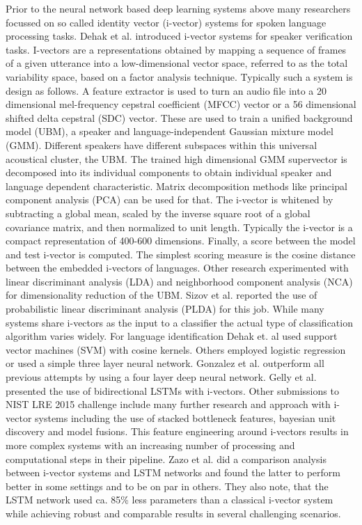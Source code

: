 Prior to the neural network based deep learning systems above many researchers focussed on so called identity vector (i-vector) systems for spoken language processing tasks. Dehak et al.\cite{dehak2011front} introduced i-vector systems for speaker verification tasks. I-vectors are a representations obtained by mapping a sequence of frames of a given utterance into a low-dimensional vector space, referred to as the total 	variability space, based on a factor analysis technique. Typically such a system is design as follows. A feature extractor is used to turn an audio file into a 20 dimensional mel-frequency cepstral coefficient (MFCC) vector or a 56 dimensional shifted delta cepstral (SDC) vector. These are used to train a unified background model (UBM), a speaker and language-independent Gaussian mixture model (GMM). Different speakers have different subspaces within this universal acoustical cluster, the UBM. The trained high dimensional GMM supervector is decomposed into its individual components to obtain individual speaker and language dependent characteristic. Matrix decomposition methods like principal component analysis (PCA) can be used for that. The i-vector is whitened by subtracting a global mean, scaled by the inverse square root of a global covariance matrix, and then normalized to unit length\cite{garcia2011analysis}. Typically the i-vector is a compact representation of 400-600 dimensions. Finally, a score between the model and test i-vector is computed. The simplest scoring measure is the cosine distance between the embedded i-vectors of languages. 
Other research\cite{dehak2011front} experimented with linear discriminant analysis (LDA) and neighborhood component analysis (NCA) for dimensionality reduction of the UBM. Sizov et al. reported the use of probabilistic linear discriminant analysis (PLDA) for this job.\cite{sizov2016discriminating}
While many systems share i-vectors as the input to a classifier the actual type of classification algorithm varies widely. For language identification Dehak et. al\cite{dehak2011front} used support vector machines (SVM) with cosine kernels. Others\cite{martinez2011language} employed logistic regression or used a simple three layer neural network\cite{plchot2016bat}. Gonzalez et al.\cite{gonzalez2015frame} outperform all previous attempts by using a four layer deep neural network. Gelly et al.\cite{gelly2016language} presented the use of bidirectional LSTMs with i-vectors. Other submissions\cite{lee20162015, torres2008mitll, ng2016sheffield} to NIST LRE 2015 challenge\cite{lre2015} include many further research and approach with i-vector systems including the use of stacked bottleneck features, bayesian unit discovery and model fusions. This feature engineering around i-vectors results in more complex systems with an increasing number of processing and computational steps in their pipeline. Zazo et al.\cite{zazo2016evaluation} did a comparison analysis between i-vector systems and LSTM networks and found the latter to perform better in some settings and to be on par in others. They also note, that the LSTM network used ca. 85\% less parameters than a classical i-vector system while achieving robust and comparable results in several challenging scenarios.


